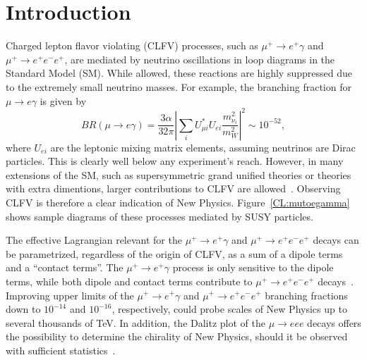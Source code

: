 \section{Introduction}
\label{sec:intro}

Charged lepton flavor violating (CLFV) processes, such as 
$\mu^+\to e^+\gamma$ and $\mu^+\to e^+e^-e^+$, are mediated by neutrino oscillations in loop diagrams in the Standard Model (SM). While allowed, these reactions are highly suppressed due to the extremely small neutrino masses. For example, the branching fraction for $\mu \to e \gamma$ is given by~\cite{xxx}
\begin{equation}
BR(\mu \rightarrow e \gamma)=\frac{3\alpha}{32\pi}\left|\sum_i U_{\mu
i}^* U_{e i}\frac{m_{\nu_{i}}^2}{m_{W}^2}\right|^2 \sim 10^{-52},
\end{equation}
where $U_{ei}$ are the leptonic mixing matrix elements, assuming neutrinos
are Dirac particles. This is clearly well below any experiment's reach.
However, in many extensions of the SM, such as supersymmetric grand unified
theories or theories with extra dimentions, larger contributions to CLFV are
allowed~\cite{new physics}. Observing CLFV is therefore a clear indication of New Physics. Figure~\ref{CL:mutoegamma} shows sample diagrams of these processes mediated by SUSY particles.

The effective Lagrangian relevant for the $\mu^+\to e^+\gamma$ and $\mu^+\to e^+e^-e^+$
decays can be parametrized, regardless of the origin of CLFV, as a sum of
a dipole terms and a ``contact terms''. The $\mu^+\to e^+\gamma$ process is only sensitive to the dipole terms, while both dipole and contact terms contribute to $\mu^+\to e^+e^-e^+$ decays~\cite{deGouvea:2013zba}. Improving upper limits of
the $\mu^+\to e^+\gamma$ and $\mu^+\to e^+e^-e^+$ branching fractions down to $10^{-14}$ and $10^{-16}$, respectively, could probe scales of New Physics up to several thousands of TeV. In addition, the Dalitz plot of the $\mu \rightarrow eee$ decays offers the possibility to determine the chirality of New Physics, should it be observed with sufficient statistics~\cite{Okada:1999zk}. 

